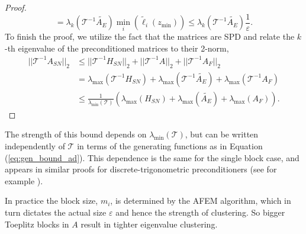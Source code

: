 \documentclass[review]{siamart251216}
\renewcommand{\vec}[1]{{{\mathbf{#1}}}}
\renewcommand{\u}{{\vec  u }}
\renewcommand{\v}{{\vec  v }}
\newcommand{\A}{{A }}
\newcommand{\offd}{{A_E}}
\newcommand{\Hank}{{ H }}
\newcommand{\toe}{{ \ell }}
\newcommand{\toef}{{ \tilde{\toe}}}
\newcommand{\Tau}{\mathcal{T}}
\newcommand{\ptau}{{\bm{\tau}}}
\begin{document}
\begin{proof}
\begin{equation}
	= \lambda_k ( \Tau^{-1} \tilde{\offd}) \min_{i} \left( \toef_i (z_{\min}) \right) \leq 
	 \lambda_k ( \Tau^{-1} \tilde{\offd}) \frac{1}{\varepsilon}.
\end{equation}
To finish the proof, we utilize the fact that the matrices are SPD and relate the $k$-th eigenvalue of the preconditioned matrices to their 2-norm, 
\begin{align*}
	|| \Tau^{-1}\A_{SN}||_2 &\leq ||\Tau^{-1} \Hank_{SN}||_2 + ||\Tau^{-1} A||_2 +||\Tau^{-1} \A_F ||_2 \\
	&= \lambda_{\max}(\Tau^{-1} \Hank_{SN}) + \lambda_{\max}(\Tau^{-1} \tilde{\offd}) + \lambda_{\max}(\Tau^{-1} \A_F) \\
	&\leq \frac{1}{\lambda_{\min}(\Tau)} \left( \lambda_{\max}(\Hank_{SN}) +  \lambda_{\max}(\tilde{\offd}) + \lambda_{\max}(\A_F) \right). 
\end{align*}
\end{proof}

The strength of this bound depends on $\lambda_{\min} (\Tau)$, but can be written independently of $\Tau$ in terms of the generating functions as in Equation (\ref{eq:gen_bound_ad}). This dependence is the same for the single block case, and appears in similar proofs for discrete-trigonometric preconditioners (see for example \cite{Kailath}). 

In practice the block size, $m_i$, is determined by the AFEM algorithm, which in turn dictates the actual size $\varepsilon$ and hence the strength of clustering. So bigger Toeplitz blocks in $\A$ result in tighter eigenvalue clustering. 
\end{document}
